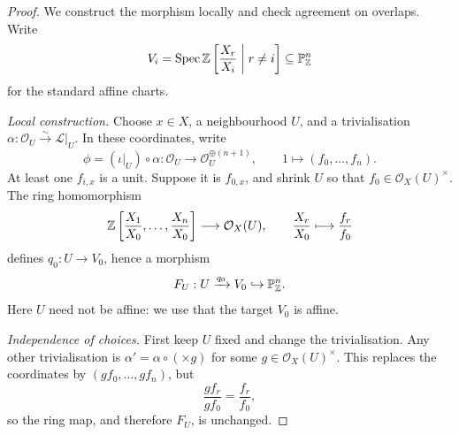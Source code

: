 \begin{proof}
    We construct the morphism locally and check agreement on overlaps.
    Write
    \[
        V_i=\operatorname{Spec}\mathbb{Z}\left[\frac{X_r}{X_i}\;\middle|\;r\ne i\right]
        \subseteq\mathbb{P}^n_{\mathbb{Z}}
    \]
    for the standard affine charts.

    \emph{Local construction.}
    Choose \(x\in X\), a neighbourhood \(U\), and a trivialisation
    \(\alpha:\mathcal{O}_U\xrightarrow{\sim}\mathcal{L}|_U\).
    In these coordinates, write
    \[
        \phi=(\iota|_U)\circ\alpha:
        \mathcal{O}_U\longrightarrow\mathcal{O}_U^{\oplus(n+1)},
        \qquad 1\longmapsto(f_0,\dots,f_n).
    \]
    At least one \(f_{i,x}\) is a unit. Suppose it is \(f_{0,x}\), and
    shrink \(U\) so that \(f_0\in\mathcal{O}_X(U)^\times\).
    The ring homomorphism
    \[
        \mathbb{Z}\left[\frac{X_1}{X_0},\dots,\frac{X_n}{X_0}\right]
        \longrightarrow\mathcal{O}_X(U),
        \qquad \frac{X_r}{X_0}\longmapsto\frac{f_r}{f_0}
    \]
    defines \(q_0:U\to V_0\), hence a morphism
    \[
        F_U:U\xrightarrow{q_0}V_0\hookrightarrow\mathbb{P}^n_{\mathbb{Z}}.
    \]
    Here \(U\) need not be affine: we use that the target \(V_0\) is affine.

    \emph{Independence of choices.}
    First keep \(U\) fixed and change the trivialisation. Any other
    trivialisation is \(\alpha'=\alpha\circ(\times g)\) for some
    \(g\in\mathcal{O}_X(U)^\times\). This replaces the coordinates by
    \((gf_0,\dots,gf_n)\), but
    \[
        \frac{gf_r}{gf_0}=\frac{f_r}{f_0},
    \]
    so the ring map, and therefore \(F_U\), is unchanged.


\end{proof}
